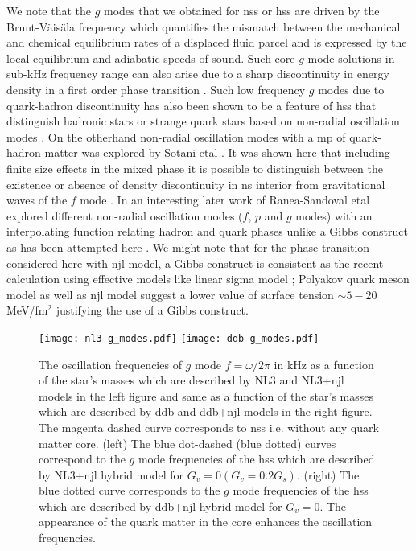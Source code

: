 \documentclass[a4paper, 11pt]{article}
\begin{document}
We note that the $g$ modes that we obtained for \ac{ns}s or \ac{hs}s are driven by the Brunt-V\"{a}is\"{a}la frequency which quantifies the mismatch between the mechanical and chemical equilibrium rates of a displaced fluid parcel and is expressed by the local equilibrium and adiabatic speeds of sound. Such core $g$ mode solutions in sub-kHz frequency range can also arise due to a sharp discontinuity in energy density in a first order phase transition \cite{Miniutti:2004, Krueger:2015}. Such low frequency $g$ modes due to quark-hadron discontinuity has also been shown to be a feature of \ac{hs}s that distinguish hadronic stars or strange quark stars based on non-radial oscillation modes \cite{Flores:2013}. On the otherhand non-radial oscillation modes with a \ac{mp} of quark-hadron matter was explored by Sotani etal \cite{Sotani:2010}. It was shown here that including finite size effects in the mixed phase it is possible to distinguish between the existence or absence of density discontinuity in \ac{ns} interior from gravitational waves of the $f$ mode \cite{Sotani:2010}. In an interesting later work of Ranea-Sandoval etal explored different non-radial oscillation modes ($f$, $p$ and $g$ modes) with an interpolating function relating hadron and quark phases unlike a Gibbs construct as has been attempted here \cite{Sandoval:2018}. We might note that for the phase transition considered here with \ac{njl} model, a Gibbs construct is consistent as the recent calculation using effective models like linear sigma model \cite{Palhares:2010}; Polyakov quark meson model \cite{Mintz:2012} as well as \ac{njl} model \cite{Pinto:2012} suggest a lower value of surface tension $\sim 5-20$MeV/fm$^2$ justifying the use of a Gibbs construct.

\begin{figure}
\centering
\texttt{[image: nl3-g\_modes.pdf]}
\texttt{[image: ddb-g\_modes.pdf]}
\caption{The oscillation frequencies of $g$ mode $f={\omega}/{2\pi}$ in kHz as a function of the star's masses  which are described by NL3 and NL3+\ac{njl} models in the left figure and same as a function of the star's masses which are described by \ac{ddb} and \ac{ddb}+\ac{njl} models in the right figure. The magenta dashed curve corresponds to \ac{ns}s i.e. without any quark matter core. (left) The blue dot-dashed (blue dotted) curves correspond to the $g$ mode frequencies of the \ac{hs}s which are described by NL3+\ac{njl} hybrid model for $G_v=0 (G_v=0.2 G_s)$. (right) The blue dotted curve corresponds to the $g$ mode frequencies of the \ac{hs}s which are described by \ac{ddb}+\ac{njl} hybrid model for $G_v=0$. The appearance of the quark matter in the core enhances the oscillation frequencies.}
\label{figure:hyb-modes_g}
\end{figure}
\end{document}

